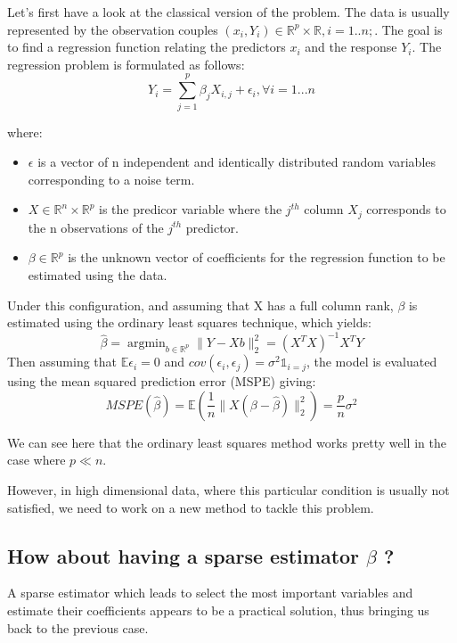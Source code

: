 \documentclass[10pt,onecolumn,letterpaper]{article}
\DeclareMathOperator*{\argmin}{argmin}
\begin{document}
Let’s first have a look at the classical version of the problem. The data is usually represented by the observation couples $(x_i, Y_i)  \in \mathbb{R}^p \times \mathbb{R}, i = 1 .. n;$. The goal is to find a regression function relating the predictors $x_i$ and the response $Y_i$.
The regression problem is formulated as follows:
$$
Y_i = \sum_{j=1}^p \beta_j X_{i,j} + \epsilon_i, \forall i = 1...n
$$

where: 

\begin{itemize}
   \item $ \epsilon$ is a vector of n independent and identically distributed random variables corresponding to a noise term.
   \item $X \in \mathbb{R}^n \times \mathbb{R}^p $ is the predicor variable where the $j^{th}$ column $X_j$ corresponds to the n observations of the $j^{th}$ predictor. 
   \item  $\beta \in \mathbb{R}^p$ is the unknown vector of coefficients for the regression function to be estimated using the data.
\end{itemize}

Under this configuration, and assuming that X has a full column rank, $\beta$ is estimated using the ordinary least squares technique, which yields:
$$
\hat{\beta} = \argmin_{b \in \mathbb{R}^p} \lVert Y - Xb \rVert_2^2 = \left(X^TX\right)^{-1}X^TY
$$
Then assuming that $ \mathbb{E}\epsilon_i = 0$ and $cov(\epsilon_i, \epsilon_j) = \sigma^2 \mathds{1}_{i=j} $, the model is evaluated using the mean squared prediction error (MSPE) giving:
$$
MSPE(\hat{\beta}) = \mathbb{E}\left(\frac{1}{n} \lVert X\left(\beta - \hat{\beta}\right) \rVert^2_2 \right) = \frac{p}{n}\sigma^2
$$

We can see here that the ordinary least squares method works pretty well in the case where $p \ll n$. 

However, in high dimensional data, where this particular condition is usually not satisfied, we need to work on a new method to tackle this problem.\\


\subsection{How about having a sparse estimator $\beta$ ?}

A sparse estimator which leads to select the most important variables and estimate their coefficients appears to be a practical solution, thus bringing us back to the previous case.
\end{document}
